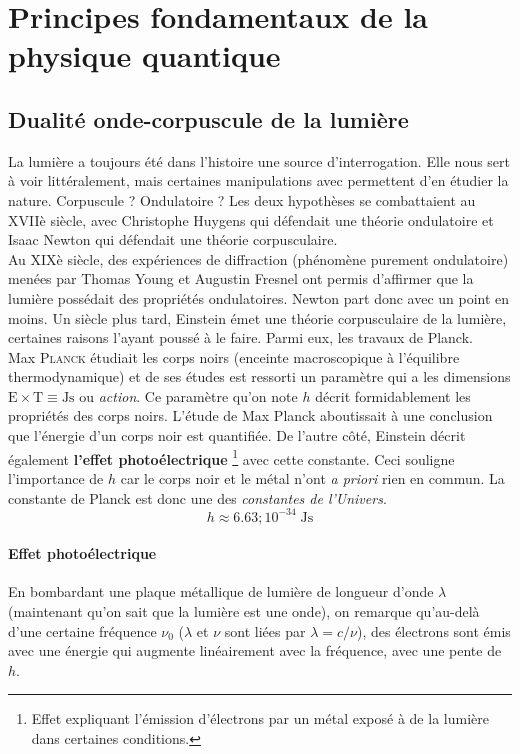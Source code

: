 \documentclass[12pt, a4paper]{book}
\author{Sami \textsc{Abdul Sater}}
\date{\hspace{-0cm}Année académique 2020-2021}
\begin{document}
\maketitle
\vfill


\thispagestyle{empty}
\restoregeometry
\tableofcontents
\chapter{Principes fondamentaux de la physique quantique}

\section{Dualité onde-corpuscule de la lumière}
La lumière a toujours été dans l'histoire une source d'interrogation. Elle nous sert à voir littéralement, mais certaines manipulations avec permettent d'en étudier la nature. Corpuscule ? Ondulatoire ? Les deux hypothèses se combattaient au XVIIè siècle, avec Christophe Huygens qui défendait une théorie ondulatoire et Isaac Newton qui défendait une théorie corpusculaire. \\

Au XIXè siècle, des expériences de diffraction (phénomène purement ondulatoire) menées par Thomas Young et Augustin Fresnel ont permis d'affirmer que la lumière possédait des propriétés ondulatoires. Newton part donc avec un point en moins. Un siècle plus tard, Einstein émet une théorie corpusculaire de la lumière, certaines raisons l'ayant poussé à le faire. Parmi eux, les travaux de Planck. \\

Max \textsc{Planck} étudiait les corps noirs (enceinte macroscopique à l'équilibre thermodynamique) et de ses études est ressorti un paramètre qui a les dimensions $\mathrm{E} \times \mathrm{T} \equiv \mathrm{Js}$ ou \textit{action}. Ce paramètre qu'on note $h$ décrit formidablement les propriétés des corps noirs. L'étude de Max Planck aboutissait à une conclusion que l'énergie d'un corps noir est quantifiée. De l'autre côté, Einstein décrit également \textbf{l'effet photoélectrique} \footnote{Effet expliquant l'émission d'électrons par un métal exposé à de la lumière dans certaines conditions.} avec cette constante. Ceci souligne l'importance de $h$ car le corps noir et le métal n'ont \textit{a priori} rien en commun. La constante de Planck est donc une des \textit{constantes de l'Univers}.
$$h \approx 6.63 ; 10^{-34} \; \mathrm{Js}$$

\subsubsection{Effet photoélectrique}
En bombardant une plaque métallique de lumière de longueur d'onde $\lambda$ (maintenant qu'on sait que la lumière est une onde), on remarque qu'au-delà d'une certaine fréquence $\nu_0$ ($\lambda$ et $\nu$ sont liées par $\lambda = c/\nu$), des électrons sont émis avec une énergie qui augmente linéairement avec la fréquence, avec une pente de $h$.
\end{document}
